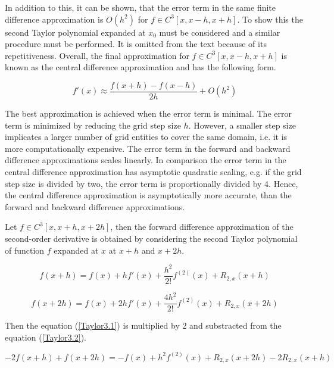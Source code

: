 In addition to this, it can be shown, that the error term in the same finite difference approximation is \(O(h^2)\) for \(f \in C^3[x, x - h, x +h]\).
To show this the second Taylor polynomial expanded at \(x_0\) must be considered and a similar procedure must be performed.
It is omitted from the text because of its repetitiveness.
Overall, the final approximation for \(f \in C^3[x, x - h, x +h]\) is known as the central difference approximation and has the following form.

\begin{equation} \label{Approx3}
 f'(x) \approx \frac{f(x + h) - f(x - h)}{2h} + O(h^2)
\end{equation}

The best approximation is achieved when the error term is minimal.
The error term is minimized by reducing the grid step size \(h\).
However, a smaller step size implicates a larger number of grid entities to cover the same domain, i.e. it is more computationally expensive.
The error term in the forward and backward difference approximations scales linearly.
In comparison the error term in the central difference approximation has asymptotic quadratic scaling, e.g. if the grid step size is divided by two, the error term is proportionally divided by 4.
Hence, the central difference approximation is asymptotically more accurate, than the forward and backward difference approximations.

Let \(f \in C^3[x, x + h, x + 2h]\), then the forward difference approximation of the second-order derivative is obtained by considering the second Taylor polynomial of function \(f\) expanded at \(x\) at \(x+h\) and \(x + 2h\).

\begin{equation} \label{Taylor3.1}
 f(x + h) = f(x) + h f'(x) + \frac{h^2}{2!} f^{(2)}(x) + R_{2, x}(x + h)
 \end{equation}

\begin{equation} \label{Taylor3.2}
 f(x + 2h) = f(x) + 2 h f'(x) + \frac{4 h^2}{2!} f^{(2)}(x) + R_{2, x}(x + 2h)
\end{equation}

Then the equation (\ref{Taylor3.1}) is multiplied by 2 and substracted from the equation (\ref{Taylor3.2}).

\begin{equation}
 -2 f(x + h) + f(x + 2h) = -f(x) + h^2 f^{(2)}(x) + R_{2, x}(x + 2h) - 2 R_{2, x}(x + h)
\end{equation}

